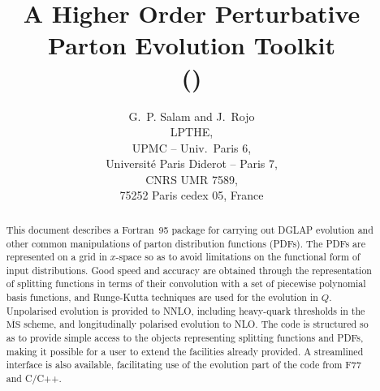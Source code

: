 \documentclass[12pt]{article}
\title{A Higher Order Perturbative Parton Evolution Toolkit \\
(\hoppet)
}
\author{G.~P. Salam and J.~Rojo\\[3pt]
  LPTHE,   \\UPMC -- Univ.\ Paris 6,\\
  Universit\'e Paris Diderot -- Paris 7,\\
  CNRS UMR 7589,\\ 75252 Paris cedex 05, France}
\date{}
\newcommand{\MSbar}{\overline{\mathrm{MS}}}
\begin{document}
\maketitle 

\begin{abstract}
  This document describes a Fortran~95 package for carrying out DGLAP
  evolution and other common manipulations of parton distribution
  functions (PDFs). The PDFs are represented on a grid in $x$-space so
  as to avoid limitations on the functional form of input
  distributions.  Good speed and accuracy are obtained through the
  representation of splitting functions in terms of their convolution
  with a set of piecewise polynomial basis functions, and Runge-Kutta
  techniques are used for the evolution in $Q$.  Unpolarised evolution
  is provided to NNLO, including heavy-quark thresholds in the
  $\MSbar$ scheme, and longitudinally polarised evolution to NLO. The
  code is structured so as to provide simple access to the objects
  representing splitting functions and PDFs, making it possible for a
  user to extend the facilities already provided.
%
  A streamlined interface is also available, facilitating use of the
  evolution part of the code from F77 and C/C++.  \smallskip
\end{abstract}

\newpage


\\
\end{document}
